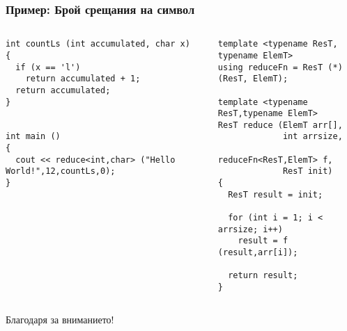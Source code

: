 \documentclass{beamer}
\begin{document}
\begin{frame}[fragile]
\frametitle{Пример: Брой срещания на символ}


\begin{columns}[t]
  \begin{column}{0.55\textwidth}

\begin{flushleft}
\begin{lstlisting}
int countLs (int accumulated, char x)
{
  if (x == 'l')
    return accumulated + 1;
  return accumulated;
}


int main ()
{
  cout << reduce<int,char> ("Hello World!",12,countLs,0);
}

\end{lstlisting}  
\end{flushleft}
  \end{column}
  \begin{column}{0.45\textwidth}
\begin{flushleft}
\vspace{-30px}
\begin{lstlisting}
template <typename ResT, typename ElemT>
using reduceFn = ResT (*) (ResT, ElemT);

template <typename ResT,typename ElemT>
ResT reduce (ElemT arr[], 
             int arrsize, 
             reduceFn<ResT,ElemT> f, 
             ResT init)
{
  ResT result = init;

  for (int i = 1; i < arrsize; i++)
    result = f (result,arr[i]);

  return result;
}
\end{lstlisting}  
\end{flushleft}

  \end{column}
\end{columns}


\end{frame}

\begin{frame}
\centerline{Благодаря за вниманието!}
\end{frame}
\end{document}
